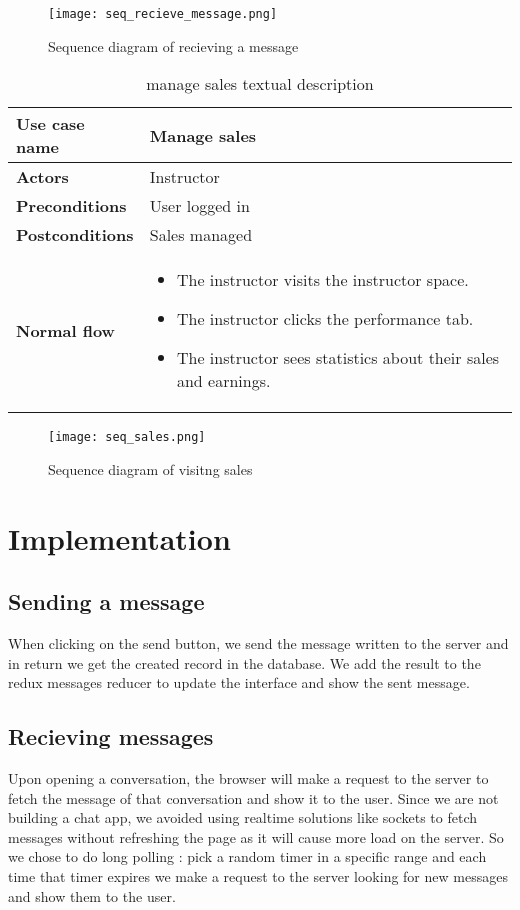 \begin{figure}[!ht]
    \centering
    \texttt{[image: seq\_recieve\_message.png]}
    \caption{Sequence diagram of recieving a message}
    \label{fig:seq_recieve_message}
\end{figure}

\begin{table}[H]
\centering
\caption{manage sales textual description}
\begin{tabular}{|p{4cm}|p{10cm}|}
\hline
\textbf{\large{Use case name}} & Manage sales \\\hline
\textbf{\large{Actors}} & Instructor \\\hline
\textbf{\large{Preconditions}} & User logged in \\\hline
\textbf{\large{Postconditions}} & Sales managed  \\\hline
\textbf{\large{Normal flow}} & 
\begin{itemize}
  \item The instructor visits the instructor space.
  \item The instructor clicks the performance tab.
  \item The instructor sees statistics about their sales and earnings.
\end{itemize}
\\\hline

\end{tabular}
\end{table}


\begin{figure}[!ht]
    \centering
    \texttt{[image: seq\_sales.png]}
    \caption{Sequence diagram of visitng sales}
    \label{fig:seq_sales}
\end{figure}


\section{Implementation}


\subsection{Sending a message}
When clicking on the send button, we send the message written to the server and in return we get the created record in the database. We add the result to the redux messages reducer to update the interface and show the sent message.

\subsection{Recieving messages}
Upon opening a conversation, the browser will make a request to the server to fetch the message of that conversation and show it to the user.
\hfill \break
Since we are not building a chat app, we avoided using realtime solutions like sockets to fetch messages without refreshing the page as it will cause more load on the server. So we chose to do long polling :  pick a random timer in a specific range and each time that timer expires we make a request to the server looking for new messages and show them to the user. 

